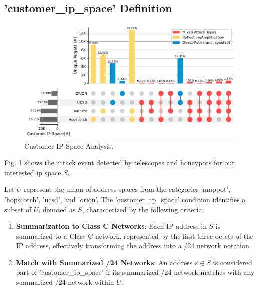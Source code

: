 \subsection*{'customer\_ip\_space' Definition}
\begin{figure}[htbp]
    \centering
    \includegraphics[scale=0.4]{graphs/space_no_event.pdf}
    \caption{Customer IP Space Analysis.}
    \label{fig:customeripspace}
\end{figure}
Fig. \ref{fig:customeripspace} shows the attack event detected by telescopes and honeypots for our interested ip space $S$.
    
Let $U$ represent the union of address spaces from the categories 'amppot', 'hopscotch', 'ucsd', and 'orion'. The 'customer\_ip\_space' condition identifies a subset of $U$, denoted as $S$, characterized by the following criteria:
\begin{enumerate}
    \item \textbf{Summarization to Class C Networks}: Each IP address in $S$ is summarized to a Class C network, represented by the first three octets of the IP address, effectively transforming the address into a /24 network notation.
    \item \textbf{Match with Summarized /24 Networks}: An address $s \in S$ is considered part of 'customer\_ip\_space' if its summarized /24 network matches with any summarized /24 network within $U$.
\end{enumerate}

